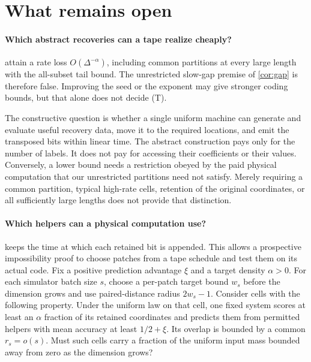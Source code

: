 \section{What remains open}\label{sec:open}

\paragraph{Which abstract recoveries can a tape realize cheaply?}
 attain a rate loss
$O(\Delta^{-\alpha})$, including common partitions at every large
length with the all-subset tail bound. The unrestricted slow-gap
premise of \cref{cor:gap} is therefore false. Improving the seed or
the exponent may give stronger coding bounds, but that alone does
not decide (T).

The constructive question is whether a single uniform machine can
generate and evaluate useful recovery data, move it to the required
locations, and emit the transposed bits within linear time. The
abstract construction pays only for the number of labels. It does
not pay for accessing their coefficients or their values. Conversely,
a lower bound needs a restriction obeyed by the paid physical
computation that our unrestricted partitions need not satisfy.
Merely requiring a common partition, typical high-rate cells,
retention of the original coordinates, or all sufficiently large
lengths does not provide that distinction.

\paragraph{Which helpers can a physical computation use?}
 keeps the time at which each retained bit is
appended. This allows a prospective impossibility proof to choose
patches from a tape schedule and test them on its actual code. Fix a positive prediction advantage $\xi$ and a target
density $\alpha>0$. For each simulator batch size $s$, choose a per-patch
target bound $w_s$ before the dimension grows and use paired-distance
radius $2w_s-1$. Consider cells with the following property. Under the
uniform law on that cell, one fixed system scores at least an $\alpha$
fraction of its retained coordinates and predicts them from permitted
helpers with mean accuracy at least $1/2+\xi$. Its overlap is bounded by
a common $r_s=o(s)$. Must such cells carry a fraction of the uniform input
mass bounded away from zero as the dimension grows?

